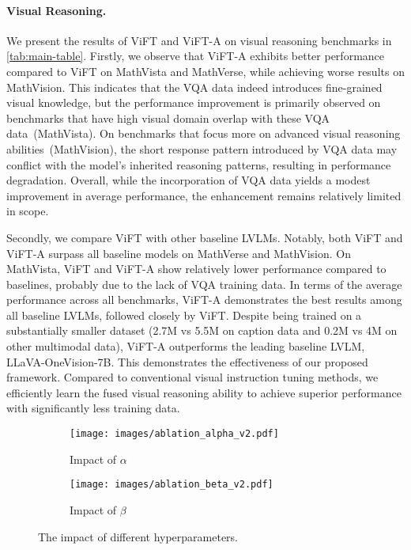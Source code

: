 \paragraph{Visual Reasoning.} We present the results of ViFT and ViFT-A on  visual reasoning benchmarks in \autoref{tab:main-table}. Firstly, we observe that ViFT-A exhibits better performance compared to ViFT on MathVista and MathVerse, while achieving worse results on MathVision. This indicates that the VQA data indeed introduces fine-grained visual knowledge, but the performance improvement is primarily observed on benchmarks that have high visual domain overlap with these VQA data~(\eg MathVista). On benchmarks that focus more on advanced visual reasoning abilities~(\eg MathVision), the short response pattern introduced by VQA data may conflict with the model's inherited reasoning patterns, resulting in performance degradation. Overall, while the incorporation of VQA data yields a modest improvement in average performance, the enhancement remains relatively limited in scope.

Secondly, we compare ViFT with other baseline LVLMs. Notably, both ViFT and ViFT-A surpass all baseline models on MathVerse and MathVision. On MathVista, ViFT and ViFT-A show relatively lower performance compared to baselines, probably due to the lack of VQA training data. In terms of the average performance across all benchmarks,
ViFT-A demonstrates the best results among all baseline LVLMs, followed closely by ViFT. Despite being trained on a substantially smaller dataset (2.7M vs 5.5M on caption data and 0.2M vs 4M on other multimodal data), ViFT-A outperforms the leading baseline LVLM, LLaVA-OneVision-7B. This demonstrates the effectiveness of our proposed framework. Compared to conventional visual instruction tuning methods, we efficiently learn the fused visual reasoning ability to achieve superior performance with significantly less training data.

\begin{figure}[t]
  \begin{subfigure}[b]{0.48\linewidth}
  \centering
    \texttt{[image: images/ablation\_alpha\_v2.pdf]}
    \caption{Impact of $\alpha$}
  \end{subfigure}\hfill
  \begin{subfigure}[b]{0.48\linewidth}
  \centering
    \texttt{[image: images/ablation\_beta\_v2.pdf]}
    \caption{Impact of $\beta$}
  \end{subfigure}
  \caption{The impact of different hyperparameters.}
  \label{tab:ablation-alpha-beta}
\end{figure}

